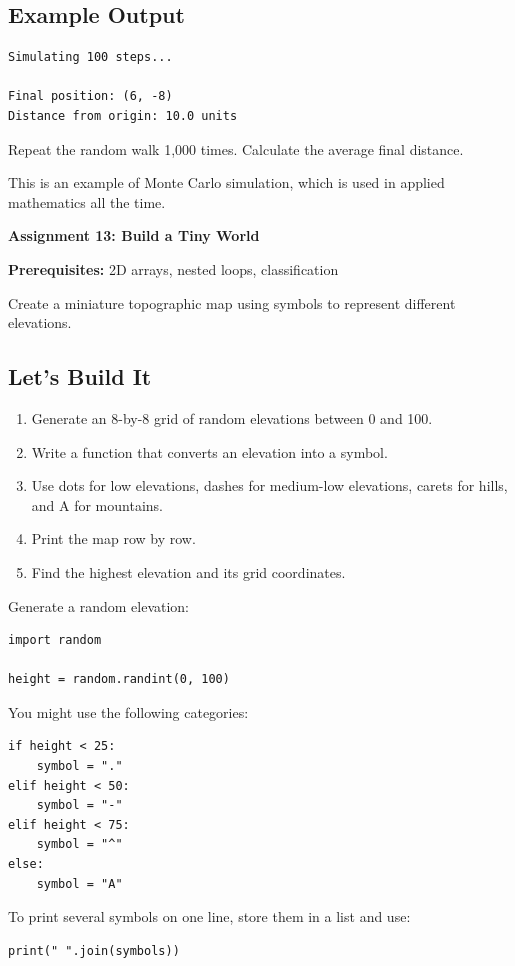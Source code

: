 \documentclass[11pt,letterpaper]{article}
\newcommand{\assignment}[3]{
    \clearpage
    {\Large\bfseries\color{navy} Assignment #1: #2}

    \vspace{2mm}
    {\small\color{darkgray}\textbf{Prerequisites:} #3}

    \vspace{3mm}
}
\newcommand{\steps}{\subsection*{Let's Build It}}
\newcommand{\exampleoutput}{\subsection*{Example Output}}
\begin{document}
\exampleoutput

\begin{lstlisting}[style=outputstyle]
Simulating 100 steps...

Final position: (6, -8)
Distance from origin: 10.0 units
\end{lstlisting}

\begin{challengebox}
Repeat the random walk 1,000 times. Calculate the average final distance.

This is an example of Monte Carlo simulation, which is used in applied mathematics all the time.
\end{challengebox}

\assignment{13}{Build a Tiny World}
{2D arrays, nested loops, classification}

\begin{missionbox}
Create a miniature topographic map using symbols to represent different elevations.
\end{missionbox}

\steps

\begin{enumerate}
    \item Generate an 8-by-8 grid of random elevations between 0 and 100.
    \item Write a function that converts an elevation into a symbol.
    \item Use dots for low elevations, dashes for medium-low elevations, carets for hills, and A for mountains. 
    \item Print the map row by row.
    \item Find the highest elevation and its grid coordinates.
\end{enumerate}

\begin{hintbox}
Generate a random elevation:

\begin{lstlisting}
import random

height = random.randint(0, 100)
\end{lstlisting}

You might use the following categories:

\begin{lstlisting}
if height < 25:
    symbol = "."
elif height < 50:
    symbol = "-"
elif height < 75:
    symbol = "^"
else:
    symbol = "A"
\end{lstlisting}

To print several symbols on one line,
store them in a list and use:

\begin{lstlisting}
print(" ".join(symbols))
\end{lstlisting}
\end{hintbox}
\end{document}
